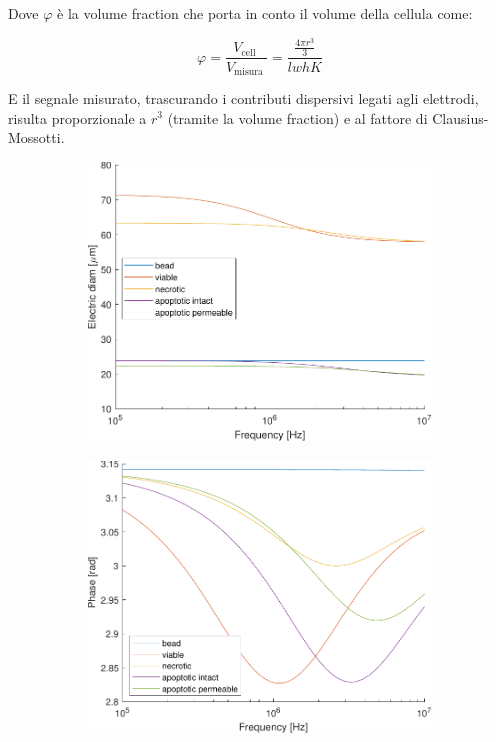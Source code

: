 Dove $\varphi$ è la volume fraction che porta in conto il volume della cellula come:

\begin{equation}
	\varphi=\frac{V_{\text {cell }}}{V_{\text {misura }}}=\frac{\frac{4 \pi r^{3}}{3}}{l w h K}
\end{equation}

E il segnale misurato, trascurando i contributi dispersivi legati agli elettrodi, risulta proporzionale a $r^3$ (tramite la volume fraction) e al fattore di Clausius-Mossotti.





\begin{figure}[t!]
	\begin{subfigure}{0.5\linewidth}
		\centering
		\includegraphics[width=0.95\linewidth]{../code/figs/diam}
		\caption{}
		\label{fig:diam}
	\end{subfigure}\hfill
	\begin{subfigure}{0.5\linewidth}
		\centering
		\includegraphics[width=0.95\linewidth]{../code/figs/phase}

\end{subfigure}
\end{figure}
